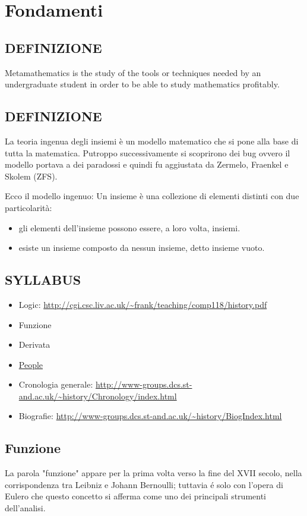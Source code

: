 \chapter{Fondamenti}

\section{DEFINIZIONE}
Metamathematics is the study of the tools or techniques needed by an undergraduate student in order to be able to study mathematics profitably. 


\section{DEFINIZIONE}
La teoria ingenua degli insiemi è un modello matematico che si pone alla base di tutta la matematica.  
Putroppo successivamente si scoprirono dei bug ovvero
il modello portava a dei paradossi e quindi fu aggiustata da Zermelo, Fraenkel e Skolem (ZFS). 

Ecco il modello ingenuo:  
Un insieme è una collezione di elementi distinti con due particolarità:  
\begin{itemize}
 \item gli elementi dell'insieme possono essere, a loro volta, insiemi.
 \item esiste un insieme composto da nessun insieme, detto insieme vuoto.
\end{itemize}

\section{SYLLABUS}
\begin{itemize}
 \item Logic: \url{http://cgi.csc.liv.ac.uk/~frank/teaching/comp118/history.pdf}
 \item Funzione
 \item Derivata
 \item \href{People.html}{People}
 \item Cronologia generale: \url{http://www-groups.dcs.st-and.ac.uk/~history/Chronology/index.html}
 \item Biografie: \url{http://www-groups.dcs.st-and.ac.uk/~history/BiogIndex.html}
\end{itemize}

\section{Funzione}
La parola "funzione" appare per la prima volta verso la fine del XVII secolo, nella corrispondenza tra Leibniz e Johann Bernoulli; tuttavia \'{e} solo con l'opera di Eulero
che questo concetto si afferma come uno dei principali strumenti dell'analisi.

